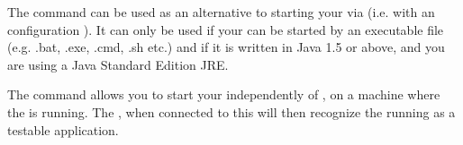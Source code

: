 


The  command can be used as an alternative to starting your \gdaut{} via \app{} (i.e. with an \gdaut{} configuration ). It can only be used if your \gdaut{} can be started by an executable file (e.g. .bat, .exe, .cmd, .sh etc.) and if it is written in Java 1.5 or above, and you are using a Java Standard Edition JRE. 



The command allows you to start your \gdaut{} independently of \app{}, on a machine where the \gdagent{} is running. The \app{} \ite{}, when connected to this \gdagent{} will then recognize the running \gdaut{} as a testable application. 

